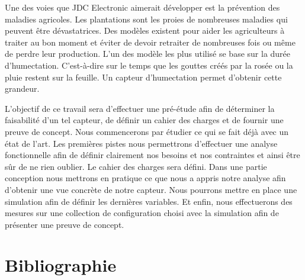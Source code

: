 \documentclass[a4paper, french, 10pt]{article} %
\begin{document}
Une des voies que JDC Electronic aimerait développer est la prévention des maladies agricoles. Les plantations sont les proies de nombreuses maladies qui peuvent être dévastatrices. Des modèles existent pour aider les agriculteurs à traiter au bon moment et éviter de devoir retraiter de nombreuses fois ou même de perdre leur production. L'un des modèle les plus utilisé \cite{doi:10.1094/PDIS-05-14-0529-FE}  se base sur la durée d'humectation. C'est-à-dire sur le temps que les gouttes créés par la rosée ou la pluie restent sur la feuille. Un capteur d'humectation permet d'obtenir cette grandeur.

L'objectif de ce travail sera d'effectuer une pré-étude afin de déterminer la faisabilité d'un tel capteur, de définir un cahier des charges et de fournir une preuve de concept. Nous commencerons par étudier ce qui se fait déjà avec un état de l'art. Les premières pistes nous permettrons d'effectuer une analyse fonctionnelle afin de définir clairement nos besoins et nos contraintes et ainsi être sûr de ne rien oublier. Le cahier des charges sera défini. Dans une partie conception nous mettrons en pratique ce que nous a appris notre analyse afin d'obtenir une vue concrète de notre capteur. Nous pourrons mettre en place une simulation afin de définir les dernières variables. Et enfin, nous effectuerons des mesures sur une collection de configuration choisi avec la simulation afin de présenter une preuve de concept.










\section{Bibliographie}

\printbibliography
\end{document}
